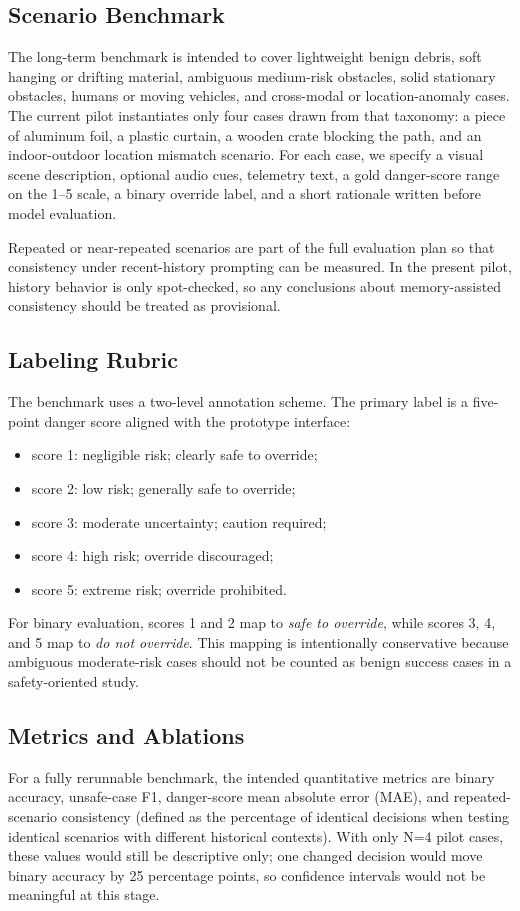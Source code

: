\documentclass[conference]{IEEEtran}
\begin{document}
\subsection{Scenario Benchmark}
The long-term benchmark is intended to cover lightweight benign debris, soft hanging or drifting material, ambiguous medium-risk obstacles, solid stationary obstacles, humans or moving vehicles, and cross-modal or location-anomaly cases. The current pilot instantiates only four cases drawn from that taxonomy: a piece of aluminum foil, a plastic curtain, a wooden crate blocking the path, and an indoor-outdoor location mismatch scenario. For each case, we specify a visual scene description, optional audio cues, telemetry text, a gold danger-score range on the 1--5 scale, a binary override label, and a short rationale written before model evaluation.

Repeated or near-repeated scenarios are part of the full evaluation plan so that consistency under recent-history prompting can be measured. In the present pilot, history behavior is only spot-checked, so any conclusions about memory-assisted consistency should be treated as provisional.

\subsection{Labeling Rubric}
The benchmark uses a two-level annotation scheme. The primary label is a five-point danger score aligned with the prototype interface:
\begin{itemize}
    \item score 1: negligible risk; clearly safe to override;
    \item score 2: low risk; generally safe to override;
    \item score 3: moderate uncertainty; caution required;
    \item score 4: high risk; override discouraged;
    \item score 5: extreme risk; override prohibited.
\end{itemize}
For binary evaluation, scores 1 and 2 map to \emph{safe to override}, while scores 3, 4, and 5 map to \emph{do not override}. This mapping is intentionally conservative because ambiguous moderate-risk cases should not be counted as benign success cases in a safety-oriented study.

\subsection{Metrics and Ablations}
For a fully rerunnable benchmark, the intended quantitative metrics are binary accuracy, unsafe-case F1, danger-score mean absolute error (MAE), and repeated-scenario consistency (defined as the percentage of identical decisions when testing identical scenarios with different historical contexts). With only N=4 pilot cases, these values would still be descriptive only; one changed decision would move binary accuracy by 25 percentage points, so confidence intervals would not be meaningful at this stage.
\end{document}
